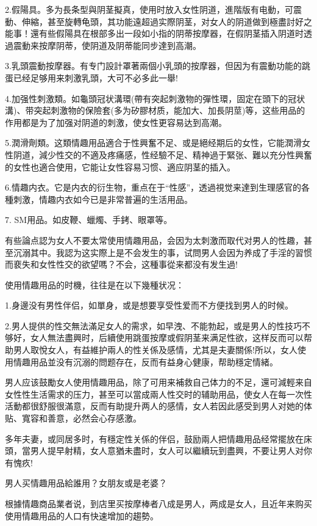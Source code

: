 \documentclass[12pt,UTF8]{ctexbook}
\begin{document}
2.假陽具。多为長条型與阴茎擬真，使用时放入女性阴道，進階版有电動，可震動、伸縮，甚至旋轉龟頭，其功能遠超過实際阴茎，对女人的阴道做到極盡討好之能事！還有些假陽具在根部多出一段如小指的阴蒂按摩器，在假阴茎插入阴道时透過震動来按摩阴蒂，使阴道及阴蒂能同步達到高潮。

3.乳頭震動按摩器。有专门設計罩著兩個小乳頭的按摩器，但因为有震動功能的跳蛋已经足够用来刺激乳頭，大可不必多此一舉!

4.加强性刺激類。如龜頭冠状溝環(帶有突起刺激物的彈性環，固定在頭下的冠状溝)、带突起刺激物的保險套(多为矽膠材质，能加大、加長阴莖)等，这些用品的作用都是为了加强对阴道的刺激，使女性更容易达到高潮。

5.潤滑劑類。这類情趣用品適合于性興奮不足、或是絕经期后的女性，它能潤滑女性阴道，減少性交的不適及疼痛感，性经驗不足、精神過于緊张、難以充分性興奮的女性也適合使用，它能让女性容易习惯、適应阴茎的插入。

6.情趣内衣。它是内衣的衍生物，重点在于“性感”，透過視觉来達到生理感官的各種刺激，情趣内衣如今已是非常普遍的生活用品。

7. SM用品。如皮鞭、蠟燭、手銬、眼罩等。

有些論点認为女人不要太常使用情趣用品，会因为太刺激而取代对男人的性趣，甚至沉溺其中。我認为这实際上是不会发生的事，试問男人会因为养成了手淫的習惯而裵失和女性性交的欲望嗎？不会，这種事從来都没有发生過!

使用情趣用品的时機，往往是在以下幾種状况：

1.身邊没有男性伴侣，如單身，或是想要享受性爱而不方便找到男人的时候。

2.男人提供的性交無法滿足女人的需求，如早洩、不能勃起，或是男人的性技巧不够好，女人無法盡興时，后續使用跳蛋按摩或假阴茎来满足性欲，这样反而可以帮助男人取悅女人，有益維护兩人的性关係及感情，尤其是夫妻關係!所以，女人使用情趣用品並没有沉溺的問题存在，反而有益身心健康，帮助穩定情緒。

男人应该鼓勵女人使用情趣用品，除了可用来補救自己体力的不足，還可減輕来自女性性生活需求的压力，甚至可以當成兩人性交时的辅助用品，使女人在每一次性活動都很舒服很滿意，反而有助提升两人的感情，女人若因此感受到男人对她的体贴、寬容和善意，必然会心存感激。

多年夫妻，或同居多时，有穩定性关係的伴侣，鼓励兩人把情趣用品经常擺放在床頭，當男人提早射精，女人意猶未盡时，女人可以繼續玩到盡興，不要让男人对你有愧疚!

男人买情趣用品給誰用？女朋友或是老婆？

根據情趣商品業者说，到店里买按摩棒者八成是男人，两成是女人，且近年来购买使用情趣用品的人口有快速增加的趨勢。
\end{document}
